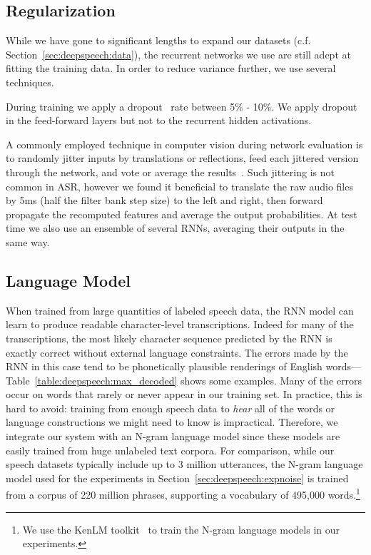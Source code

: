 \subsection{Regularization}

While we have gone to significant lengths to expand our datasets (c.f.
Section~\ref{sec:deepspeech:data}), the recurrent networks we use are still
adept at fitting the training data. In order to reduce variance further, we use
several techniques.  

During training we apply a dropout~\cite{hinton2012dropout} rate between 5\% -
10\%. We apply dropout in the feed-forward layers but not to the recurrent
hidden activations.

A commonly employed technique in computer vision during network evaluation is
to randomly jitter inputs by translations or reflections, feed each jittered
version through the network, and vote or average the
results~\cite{krizhevsky2012imagenet}. Such jittering is not common in ASR,
however we found it beneficial to translate the raw audio files by 5ms (half
the filter bank step size) to the left and right, then forward propagate the
recomputed features and average the output probabilities. At test time we also
use an ensemble of several RNNs, averaging their outputs in the same way.

\subsection{Language Model}
\label{sec:deepspeech:languagemodel}

When trained from large quantities of labeled speech data, the RNN model can
learn to produce readable character-level transcriptions. Indeed for many of
the transcriptions, the most likely character sequence predicted by the RNN is
exactly correct without external language constraints. The errors made by the
RNN in this case tend to be phonetically plausible renderings of English
words---Table~\ref{table:deepspeech:max_decoded} shows some examples. Many of
the errors occur on words that rarely or never appear in our training set. In
practice, this is hard to avoid:  training from enough speech data to
\emph{hear} all of the words or language constructions we might need to know is
impractical.  Therefore, we integrate our system with an N-gram language model
since these models are easily trained from huge unlabeled text corpora. For
comparison, while our speech datasets typically include up to 3 million
utterances, the N-gram language model used for the experiments in
Section~\ref{sec:deepspeech:expnoise} is trained from a corpus of 220 million
phrases, supporting a vocabulary of 495,000 words.\footnote{We use the KenLM
toolkit~\cite{heafield2013} to train the N-gram language models in our
experiments.} 


